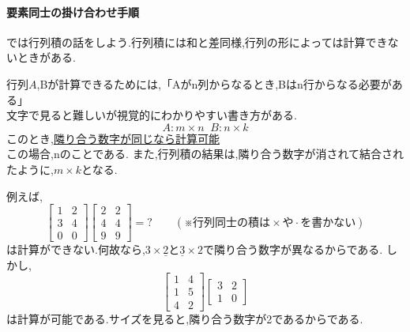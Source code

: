 \paragraph{要素同士の掛け合わせ手順}
では行列積の話をしよう.行列積には和と差同様,行列の形によっては計算できないときがある.
\begin{tcolorbox}[colframe=black!80,colback=white,title=行列積の計算可能なサイズの組み合わせ]
行列$A$,Bが計算できるためには,「Aがn列からなるとき,Bはn行からなる必要がある」\\
文字で見ると難しいが視覚的にわかりやすい書き方がある.
\[A:m\times n \; \; B:n\times k\]
このとき,\underline{隣り合う数字が同じなら計算可能}\\
この場合,nのことである.
また,行列積の結果は,隣り合う数字が消されて結合されたように,$m\times k$となる.
\end{tcolorbox}
例えば,
\[
\begin{bmatrix}
    1 & 2 \\ 3 & 4 \\ 0 & 0
\end{bmatrix}
\begin{bmatrix}
    2 & 2 \\ 4 & 4 \\ 9 & 9
\end{bmatrix}=?\qquad(\text{※行列同士の積は}\times\text{や}\cdot\text{を書かない})
\]
は計算ができない.何故なら,$3\times\underline{2}$と$\underline{3}\times2$で隣り合う数字が異なるからである.
しかし,
\[
\begin{bmatrix}
    1 & 4 \\ 1 & 5 \\ 4 & 2
\end{bmatrix}
\begin{bmatrix}
    3 & 2 \\ 1 & 0
\end{bmatrix}
\]は計算が可能である.サイズを見ると,隣り合う数字が2であるからである.

